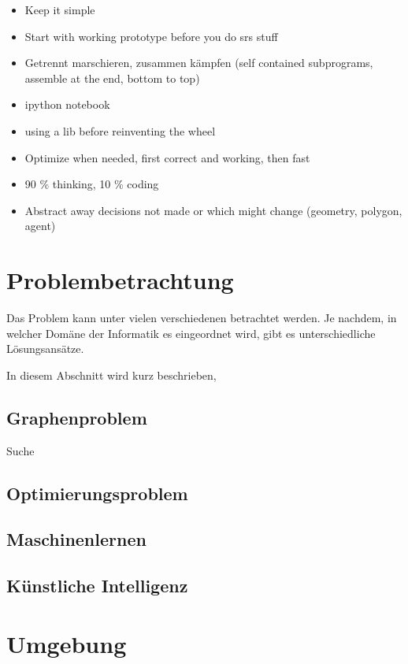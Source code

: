 \documentclass{article}
\begin{document}
\begin{itemize}
\item Keep it simple
\item Start with working prototype before you do srs stuff
\item Getrennt marschieren, zusammen kämpfen (self contained subprograms, assemble at the end, bottom to top)
\item ipython notebook
\item using a lib before reinventing the wheel
\item Optimize when needed, first correct and working, then fast
\item 90 \% thinking, 10 \% coding
\item Abstract away decisions not made or which might change (geometry, polygon, agent)
\end{itemize}

\clearpage
\section{Problembetrachtung}

Das Problem kann unter vielen verschiedenen betrachtet 
werden. Je nachdem, in welcher Domäne der Informatik
es eingeordnet wird, gibt es unterschiedliche Lösungsansätze.

In diesem Abschnitt wird kurz beschrieben, 

\subsection{Graphenproblem}

Suche

\subsection{Optimierungsproblem}

\subsection{Maschinenlernen}

\subsection{Künstliche Intelligenz}



\clearpage
\section{Umgebung}
\end{document}

